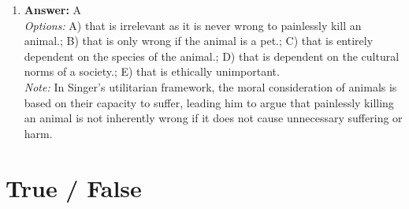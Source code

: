 \documentclass[12pt]{article}
\begin{document}
\begin{enumerate}[label=\arabic*.]
\item \textbf{Answer:} A
\\ \textit{Options:} A) that is irrelevant as it is never wrong to painlessly kill an animal.; B) that is only wrong if the animal is a pet.; C) that is entirely dependent on the species of the animal.; D) that is dependent on the cultural norms of a society.; E) that is ethically unimportant.
\\ \textit{Note:} In Singer's utilitarian framework, the moral consideration of animals is based on their capacity to suffer, leading him to argue that painlessly killing an animal is not inherently wrong if it does not cause unnecessary suffering or harm.
\end{enumerate}

\section*{True / False}
\end{document}
